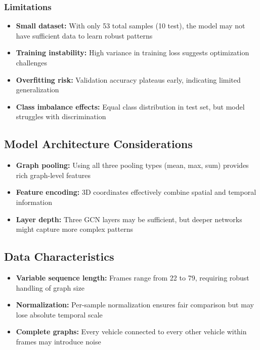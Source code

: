 \documentclass[11pt,a4paper]{article}
\begin{document}
\subsubsection{Limitations}
\begin{itemize}
    \item \textbf{Small dataset:} With only 53 total samples (10 test), the model may not have sufficient data to learn robust patterns
    \item \textbf{Training instability:} High variance in training loss suggests optimization challenges
    \item \textbf{Overfitting risk:} Validation accuracy plateaus early, indicating limited generalization
    \item \textbf{Class imbalance effects:} Equal class distribution in test set, but model struggles with discrimination
\end{itemize}

\subsection{Model Architecture Considerations}

\begin{itemize}
    \item \textbf{Graph pooling:} Using all three pooling types (mean, max, sum) provides rich graph-level features
    \item \textbf{Feature encoding:} 3D coordinates effectively combine spatial and temporal information
    \item \textbf{Layer depth:} Three GCN layers may be sufficient, but deeper networks might capture more complex patterns
\end{itemize}

\subsection{Data Characteristics}

\begin{itemize}
    \item \textbf{Variable sequence length:} Frames range from 22 to 79, requiring robust handling of graph size
    \item \textbf{Normalization:} Per-sample normalization ensures fair comparison but may lose absolute temporal scale
    \item \textbf{Complete graphs:} Every vehicle connected to every other vehicle within frames may introduce noise
\end{itemize}
\end{document}
